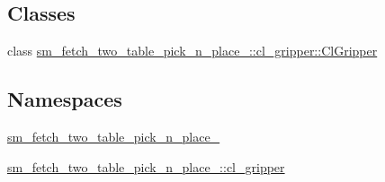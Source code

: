 \subsection*{Classes}
\begin{DoxyCompactItemize}
\item 
class \hyperlink{classsm__fetch__two__table__pick__n__place__1_1_1cl__gripper_1_1ClGripper}{sm\+\_\+fetch\+\_\+two\+\_\+table\+\_\+pick\+\_\+n\+\_\+place\+\_\+::cl\+\_\+gripper\+::\+Cl\+Gripper}
\end{DoxyCompactItemize}
\subsection*{Namespaces}
\begin{DoxyCompactItemize}
\item 
 \hyperlink{namespacesm__fetch__two__table__pick__n__place__1}{sm\+\_\+fetch\+\_\+two\+\_\+table\+\_\+pick\+\_\+n\+\_\+place\+\_}
\item 
 \hyperlink{namespacesm__fetch__two__table__pick__n__place__1_1_1cl__gripper}{sm\+\_\+fetch\+\_\+two\+\_\+table\+\_\+pick\+\_\+n\+\_\+place\+\_\+::cl\+\_\+gripper}
\end{DoxyCompactItemize}
